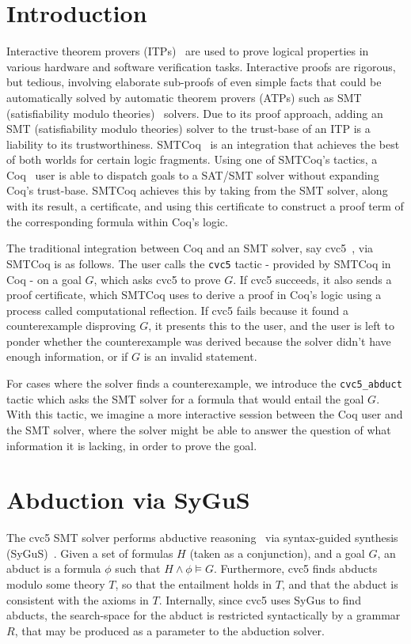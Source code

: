 \documentclass[conference]{IEEEtran}
\begin{document}
\section{Introduction}
  Interactive theorem provers 
  (ITPs)~\cite{10.5555/1965123} are used to 
  prove logical properties in 
  various hardware and software verification tasks. 
  Interactive proofs are rigorous, but tedious, 
  involving elaborate sub-proofs of even simple 
  facts that could be automatically solved by automatic
  theorem provers (ATPs)
  such as SMT (satisfiability modulo 
  theories)~\cite{DBLP:reference/mc/BarrettT18} 
  solvers. Due to its proof approach, 
  adding an SMT (satisfiability modulo theories) 
  solver to the trust-base of an ITP is a liability 
  to its trustworthiness. 
  SMTCoq~\cite{10.1007/978-3-642-25379-9_12} is an 
  integration that achieves the best of both 
  worlds for certain logic fragments. Using one of 
  SMTCoq's tactics, a Coq~\cite{Thery2006} 
  user is able to dispatch goals 
  to a SAT/SMT solver without expanding Coq's trust-base. 
  SMTCoq achieves this by taking from the SMT 
  solver, along with its result, a certificate, and 
  using this certificate to construct a proof 
  term of the corresponding formula within Coq's 
  logic. 
  
  The traditional integration between Coq and 
  an SMT solver, say 
  cvc5~\cite{DBLP:conf/tacas/BarbosaBBKLMMMN22}, 
  via SMTCoq is as follows. The user 
  calls the \texttt{cvc5} tactic - provided by SMTCoq 
  in Coq - on a goal $G$, which asks cvc5 to prove
  $G$. If cvc5 succeeds, it also sends a proof 
  certificate, which SMTCoq uses to derive a proof 
  in Coq's logic using a process called computational
  reflection. If cvc5 fails because it found a 
  counterexample disproving $G$, it presents this 
  to the user, and the user is left to ponder whether 
  the counterexample was derived because the solver 
  didn't have enough information, or if $G$ is an 
  invalid statement.
  
  For cases where the solver finds a counterexample, 
  we introduce the \texttt{cvc5\_abduct} tactic which
  asks the SMT solver for a formula that would entail
  the goal $G$. With this tactic, we imagine a more 
  interactive session between the Coq user and the
  SMT solver, where the solver might be able to answer
  the question of what information it is lacking, in 
  order to prove the goal.
  

\section{Abduction via SyGuS}
  The cvc5 SMT solver performs abductive
  reasoning~\cite{DBLP:conf/cade/ReynoldsBLT20} 
  via syntax-guided synthesis
  (SyGuS)~\cite{6679385}. Given a 
  set of formulas $H$ (taken as a conjunction), 
  and a goal $G$, an abduct is a formula $\phi$ such
  that $H \land \phi \models G$. Furthermore, cvc5
  finds abducts modulo some theory $T$, so that 
  the entailment holds in $T$, and that 
  the abduct is consistent with the axioms in 
  $T$. Internally, since cvc5 uses SyGus to find
  abducts, the search-space for the abduct is 
  restricted syntactically by a grammar $R$, that may 
  be produced as a parameter to the abduction solver.
  
\end{document}
